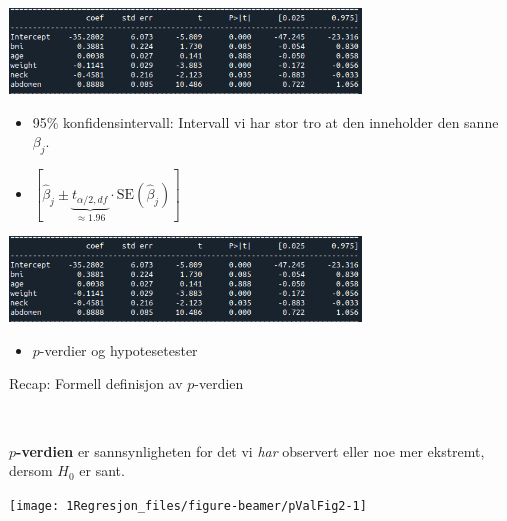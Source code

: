 \documentclass[10pt,ignorenonframetext,]{beamer}
\providecommand{\tightlist}{%
  \setlength{\itemsep}{0pt}\setlength{\parskip}{0pt}}
\begin{document}
\begin{frame}

\includegraphics[width=0.7\textwidth,height=\textheight]{ols_result_all_coefs.png}

\vspace{5mm}

\begin{itemize}
\item
  95\% konfidensintervall: Intervall vi har stor tro at den inneholder
  den sanne \(\beta_j\).
\item
  \([\hat\beta_j \pm \underbrace{t_{\alpha/2,df}}_{\approx 1.96}\cdot \text{SE}(\hat\beta_j)]\)
\end{itemize}

\vspace{20mm}

\end{frame}

\begin{frame}

\includegraphics[width=0.7\textwidth,height=\textheight]{ols_result_all_coefs.png}

\vspace{5mm}

\begin{itemize}
\tightlist
\item
  \(p\)-verdier og hypotesetester
\end{itemize}

\vspace{20mm}

\end{frame}

\begin{frame}

\begin{block}{Recap: Formell definisjon av \(p\)-verdien}

\(~\)

\textbf{\(p\)-verdien} er sannsynligheten for det vi \emph{har}
observert eller noe mer ekstremt, dersom \(H_0\) er sant.

\vspace{5mm}

\begin{center}\texttt{[image: 1Regresjon\_files/figure-beamer/pValFig2-1]} \end{center}

\end{block}

\end{frame}
\end{document}
